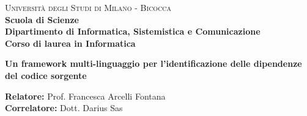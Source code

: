 \documentclass[a4paper,10pt,oneside]{book}
\begin{document}
    
    \begin{titlepage}
        
        \noindent
        \begin{minipage}[t]{0.19\textwidth}
        \end{minipage}
        \begin{minipage}[t]{0.81\textwidth}
        {
                {\textsc{Università degli Studi di Milano - Bicocca}} \\
                \textbf{Scuola di Scienze} \\
                \textbf{Dipartimento di Informatica, Sistemistica e Comunicazione} \\
                \textbf{Corso di laurea in Informatica} \\
                \par
        }
        \end{minipage}
        
	\vspace{40mm}
        
	\begin{center}
            {\LARGE{
                    \textbf{Un framework multi-linguaggio per l'identificazione delle dipendenze del codice sorgente}
                    \par
            }}
        \end{center}
        
        \vspace{50mm}

        \noindent
        {\large \textbf{Relatore:} Prof. Francesca Arcelli Fontana} \\

        \noindent
        {\large \textbf{Correlatore:} Dott. Darius Sas}
        
        \vspace{15mm}


\end{titlepage}
\end{document}
